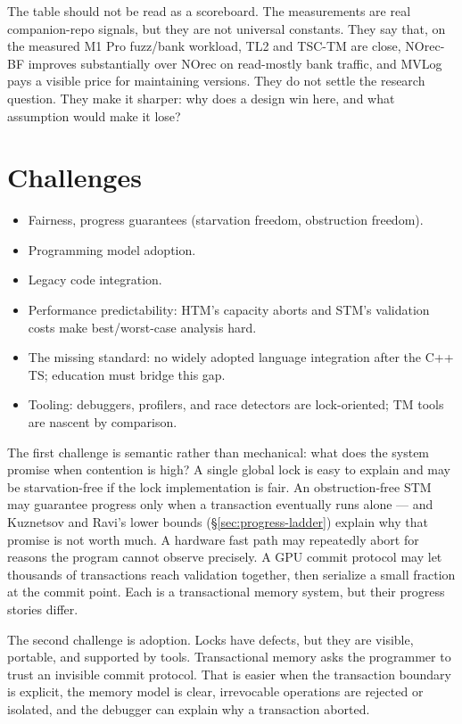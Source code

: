 The table should not be read as a scoreboard. The measurements are real companion-repo signals, but they are not universal constants. They say that, on the measured M1 Pro fuzz/bank workload, TL2 and TSC-TM are close, NOrec-BF improves substantially over NOrec on read-mostly bank traffic, and MVLog pays a visible price for maintaining versions. They do not settle the research question. They make it sharper: why does a design win here, and what assumption would make it lose?

\section{Challenges}

\begin{itemize}
    \item Fairness, progress guarantees (starvation freedom, obstruction freedom).
    \item Programming model adoption.
    \item Legacy code integration.
    \item Performance predictability: HTM's capacity aborts and STM's validation costs make best/worst-case analysis hard.
    \item The missing standard: no widely adopted language integration after the C++ TS; education must bridge this gap.
    \item Tooling: debuggers, profilers, and race detectors are lock-oriented; TM tools are nascent by comparison.
\end{itemize}

The first challenge is semantic rather than mechanical: what does the system promise when contention is high? A single global lock is easy to explain and may be starvation-free if the lock implementation is fair. An obstruction-free STM may guarantee progress only when a transaction eventually runs alone --- and Kuznetsov and Ravi's lower bounds (\S\ref{sec:progress-ladder}) explain why that promise is not worth much. A hardware fast path may repeatedly abort for reasons the program cannot observe precisely. A GPU commit protocol may let thousands of transactions reach validation together, then serialize a small fraction at the commit point. Each is a transactional memory system, but their progress stories differ.

The second challenge is adoption. Locks have defects, but they are visible, portable, and supported by tools. Transactional memory asks the programmer to trust an invisible commit protocol. That is easier when the transaction boundary is explicit, the memory model is clear, irrevocable operations are rejected or isolated, and the debugger can explain why a transaction aborted.

